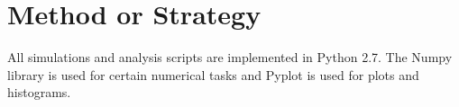 


%
%

\section{Method or Strategy}
All simulations and analysis scripts are implemented in Python 2.7. The Numpy library is used for certain numerical tasks and Pyplot is used for plots and histograms. 

